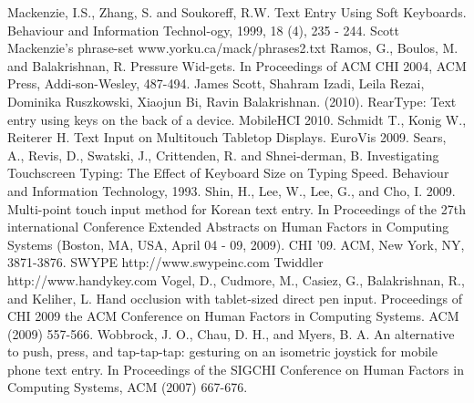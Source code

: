 \documentclass{chi2011}
\begin{document}
\begin{thebibliography}{9}
 Mackenzie, I.S., Zhang, S. and Soukoreff, R.W. Text Entry Using Soft Keyboards. Behaviour and Information Technol-ogy, 1999, 18 (4), 235 - 244.
 Scott Mackenzie's phrase-set www.yorku.ca/mack/phrases2.txt
 Ramos, G., Boulos, M. and Balakrishnan, R. Pressure Wid-gets. In Proceedings of ACM CHI 2004, ACM Press, Addi-son-Wesley, 487-494.
 James Scott, Shahram Izadi, Leila Rezai, Dominika Ruszkowski, Xiaojun Bi, Ravin Balakrishnan. (2010). RearType: Text entry using keys on the back of a device. MobileHCI 2010. 
 Schmidt T., Konig W., Reiterer H. Text Input on Multitouch Tabletop Displays. EuroVis 2009.
 Sears, A., Revis, D., Swatski, J., Crittenden, R. and Shnei-derman, B. Investigating Touchscreen Typing: The Effect of Keyboard Size on Typing Speed. Behaviour and Information Technology, 1993.
 Shin, H., Lee, W., Lee, G., and Cho, I. 2009. Multi-point touch input method for Korean text entry. In Proceedings of the 27th international Conference Extended Abstracts on Human Factors in Computing Systems (Boston, MA, USA, April 04 - 09, 2009). CHI '09. ACM, New York, NY, 3871-3876.
 SWYPE http://www.swypeinc.com
 Twiddler http://www.handykey.com
 Vogel, D., Cudmore, M., Casiez, G., Balakrishnan, R., and Keliher, L. Hand occlusion with tablet-sized direct pen input. Proceedings of CHI 2009  the ACM Conference on Human Factors in Computing Systems. ACM (2009) 557-566. 
 Wobbrock, J. O., Chau, D. H., and Myers, B. A. An alternative to push, press, and tap-tap-tap: gesturing on an isometric joystick for mobile phone text entry. In Proceedings of the SIGCHI Conference on Human Factors in Computing Systems, ACM (2007) 667-676.

\end{thebibliography}
\end{document}
